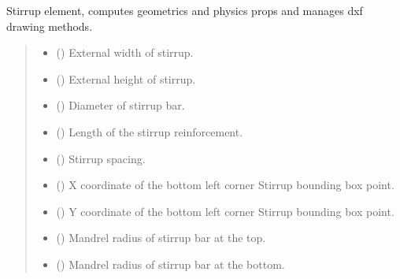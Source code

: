 \documentclass[a4paper,10pt,english]{sphinxmanual}
\begin{document}
\begin{fulllineitems}
\pysigstopsignatures
\sphinxAtStartPar
Stirrup element, computes geometrics and physics props and manages dxf drawing methods.
\begin{quote}\begin{description}
\begin{itemize}
\item {} 
\sphinxAtStartPar
{} () \textendash{} External width of stirrup.

\item {} 
\sphinxAtStartPar
{} () \textendash{} External height of stirrup.

\item {} 
\sphinxAtStartPar
{} () \textendash{} Diameter of stirrup bar.

\item {} 
\sphinxAtStartPar
{} () \textendash{} Length of the stirrup reinforcement.

\item {} 
\sphinxAtStartPar
{} () \textendash{} Stirrup spacing.

\item {} 
\sphinxAtStartPar
{} () \textendash{} X coordinate of the bottom left corner Stirrup bounding box point.

\item {} 
\sphinxAtStartPar
{} () \textendash{} Y coordinate of the bottom left corner Stirrup bounding box point.

\item {} 
\sphinxAtStartPar
{} () \textendash{} Mandrel radius of stirrup bar at the top.

\item {} 
\sphinxAtStartPar
{} () \textendash{} Mandrel radius of stirrup bar at the bottom.


\end{itemize}
\end{description}
\end{quote}
\end{fulllineitems}
\end{document}
